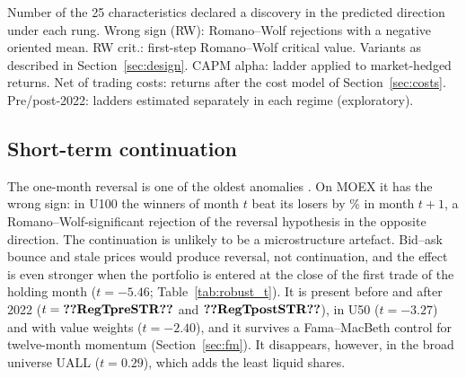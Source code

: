 \documentclass[11pt]{article}
\newcommand{\tabnote}[1]{\par\vspace{3pt}\begin{minipage}{\linewidth}\footnotesize\setstretch{1.0}#1\end{minipage}}
\newcommand{\RW}{Romano--Wolf}
\begin{document}
\begin{table}[!htbp]
\centering\small
\caption{Number of discoveries along the ladder, all specifications}\label{tab:counts}

\tabnote{Number of the 25 characteristics declared a discovery in the predicted direction under each rung. Wrong sign
(RW): \RW{} rejections with a negative oriented mean. RW crit.: first-step \RW{} critical value. Variants as described in
Section~\ref{sec:design}. CAPM alpha: ladder applied to market-hedged returns. Net of trading costs: returns after the
cost model of Section~\ref{sec:costs}. Pre/post-2022: ladders estimated separately in each regime (exploratory).}
\end{table}

\subsection{Short-term continuation}\label{sec:str}

The one-month reversal is one of the oldest anomalies \citep{jegadeesh1990evidence}. On MOEX it has the wrong sign: in
U100 the winners of month $t$ beat its losers by \% in month $t+1$, a \RW{}-significant rejection of
the reversal hypothesis in the opposite direction. The continuation is unlikely to be a microstructure artefact. Bid--ask
bounce and stale prices would produce reversal, not continuation, and the effect is even stronger when the portfolio is entered
at the close of the first trade of the holding month ($t=-5.46$; Table~\ref{tab:robust_t}). It is present before and
after 2022 ($t=\val{RegTpreSTR}$ and $\val{RegTpostSTR}$), in U50 ($t=-3.27$) and with value weights ($t=-2.40$), and it
survives a Fama--MacBeth control for twelve-month momentum (Section~\ref{sec:fm}). It disappears, however, in the broad universe UALL ($t=0.29$),
which adds the least liquid shares.
\end{document}
